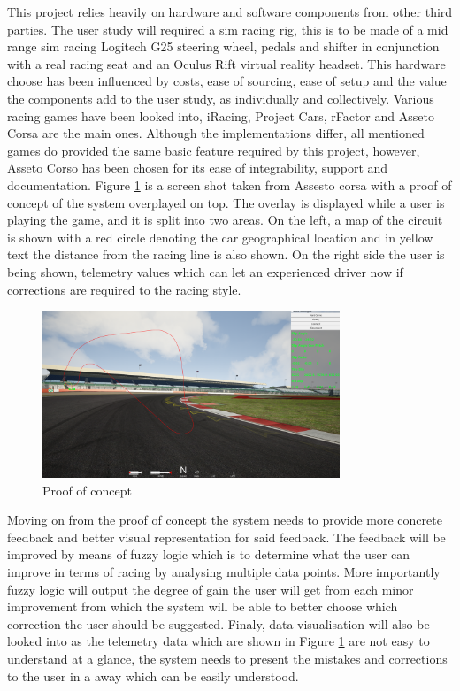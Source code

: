 \documentclass{article}
\begin{document}
This project relies heavily on hardware and software components from other third parties. The user study will required a sim racing rig, this is to be made of a mid range sim racing Logitech G25 steering wheel, pedals and shifter in conjunction with a real racing seat and an Oculus Rift virtual reality headset. This hardware choose has been influenced by costs, ease of sourcing, ease of setup and the value the components add to the user study, as individually and collectively. Various racing games have been looked into, iRacing, Project Cars, rFactor and Asseto Corsa are the main ones. Although the implementations differ, all mentioned games do provided the same basic feature required by this project, however, Asseto Corso has been chosen for its ease of integrability, support and documentation. Figure \ref{fig:ProofOfConcept} is a screen shot taken from Assesto corsa with a proof of concept of the system overplayed on top. The overlay is displayed while a user is playing the game, and it is split into two areas. On the left, a map of the circuit is shown with a red circle denoting the car geographical location and in yellow text the distance from the racing line is also shown. On the right side the user is being shown, telemetry values which can let an experienced driver now if corrections are required to the racing style.

\begin{figure}[!htb]
	\centering
	\includegraphics[height=5cm]{Proofofconcept}
	\caption{Proof of concept}
	\label{fig:ProofOfConcept}
\end{figure}

Moving on from the proof of concept the system needs to provide more concrete feedback and better visual representation for said feedback. The feedback will be improved by means of fuzzy logic which is to determine what the user can improve in terms of racing by analysing multiple data points. More importantly fuzzy logic will output the degree of gain the user will get from each minor improvement from which the system will be able to better choose which correction the user should be suggested. Finaly, data visualisation will also be looked into as the telemetry data which are shown in Figure \ref{fig:ProofOfConcept} are not easy to understand at a glance, the system needs to present the mistakes and corrections to the user in a away which can be easily understood. 
\end{document}

